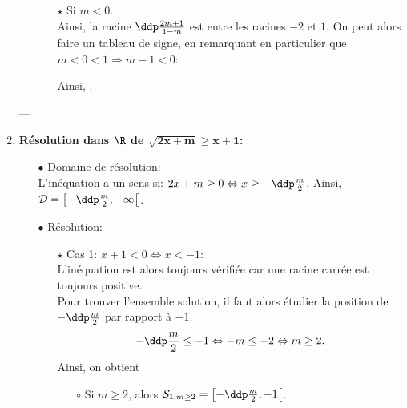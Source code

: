 \documentclass[a4paper, 11pt,reqno]{article}
\begin{document}
\begin{correction}
\begin{enumerate}
\begin{itemize}
\begin{itemize}
\item[$\star$] Si $m<0$.\\
\noindent Ainsi, la racine $\ddp\frac{2m+1}{1-m}$ est entre les racines $-2$ et $1$. On peut alors faire un tableau de signe, en remarquant en particulier que $m<0<1\Rightarrow m-1<0$:
\begin{center}
\end{center}
\vspace{0.5cm}
Ainsi, .
\end{itemize}
\end{itemize}
---
\item \textbf{R\'esolution dans $\mathbf{\R}$ de $\mathbf{\sqrt{2x+m}\geq x+1}$:}\\
\noindent \begin{itemize}
 \item[$\bullet$] Domaine de r\'esolution:\\
L'in\'equation a un sens si: $2x+m\geq 0\Leftrightarrow x\geq -\ddp\frac{m}{2}$. Ainsi, $\mathcal{D}=\left\lbrack -\ddp\frac{m}{2},+\infty\right\lbrack$.
\item[$\bullet$] R\'esolution:\\
\begin{itemize}
\item[$\star$] Cas 1: $x+1< 0\Leftrightarrow x< -1$:\\
\noindent L'in\'equation est alors toujours v\'erifi\'ee car une racine carr\'ee est toujours positive.\\
\noindent Pour trouver l'ensemble solution, il faut alors \'etudier la position de $-\ddp\frac{m}{2}$ par rapport \`a $-1$.
$$
-\ddp\frac{m}{2}\leq -1  \Leftrightarrow  -m\leq -2\Leftrightarrow  m\geq 2.$$
Ainsi, on obtient
\begin{itemize}
\item[$\circ$] Si $m\geq 2$, alors $\mathcal{S}_{1, m\geq 2}=\left\lbrack -\ddp\frac{m}{2},-1\right\lbrack$.

\end{itemize}
\end{itemize}
\end{itemize}
\end{enumerate}
\end{correction}
\end{document}
